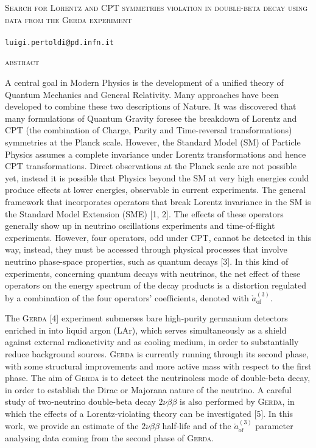 \documentclass[11pt, a4paper]{article}
\newcommand{\aof}{\mathring{a}_\text{of}^{(3)}}
\begin{document}
\begin{center}
	\Large{\textsc{Search for Lorentz and CPT symmetries violation in double-beta decay using data from the \textsc{Gerda} experiment}} \\
	\vspace{1cm}
	 \\
	\normalsize{\texttt{luigi.pertoldi@pd.infn.it}}
	\vspace{1cm}
\end{center}
\centerline{\large\textsc{abstract}}\vspace{8pt}
A central goal in Modern Physics is the development of a unified theory of Quantum Mechanics and General Relativity. Many approaches have been developed to combine these two descriptions of Nature. It was discovered that many formulations of Quantum Gravity foresee the breakdown of Lorentz and CPT (the combination of Charge, Parity and Time-reversal transformations) symmetries at the Planck scale. However, the Standard Model (SM) of Particle Physics assumes a complete invariance under Lorentz transformations and hence CPT transformations. Direct observations at the Planck scale are not possible yet, instead it is possible that Physics beyond the SM at very high energies could produce effects at lower energies, observable in current experiments. The general framework that incorporates operators that break Lorentz invariance in the SM is the Standard Model Extension (SME) [1, 2]. The effects of these operators generally show up in neutrino oscillations experiments and time-of-flight experiments. However, four operators, odd under CPT, cannot be detected in this way, instead, they must be accessed through physical processes that involve neutrino phase-space properties, such as quantum decays [3]. In this kind of experiments, concerning quantum decays with neutrinos, the net effect of these operators on the energy spectrum of the decay products is a distortion regulated by a combination of the four operators' coefficients, denoted with $\aof$.

The \textsc{Gerda} [4] experiment submerses bare high-purity germanium detectors enriched in  into liquid argon (LAr), which serves simultaneously as a shield against external radioactivity and as cooling medium, in order to substantially reduce background sources. \textsc{Gerda} is currently running through its second phase, with some structural improvements and more active mass with respect to the first phase.
The aim of \textsc{Gerda} is to detect the neutrinoless mode of double-beta decay, in order to establish the Dirac or Majorana nature of the neutrino. A careful study of two-neutrino double-beta decay $2\nu\beta\beta$ is also performed by \textsc{Gerda}, in which the effects of a Lorentz-violating theory can be investigated [5]. In this work, we provide an estimate of the $2\nu\beta\beta$ half-life and of the $\aof$ parameter analysing data coming from the second phase of \textsc{Gerda}.
\end{document}
